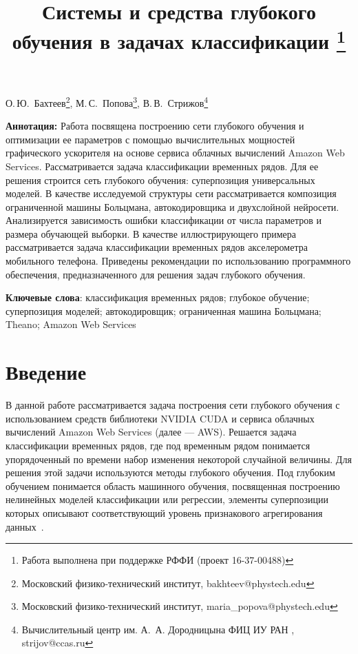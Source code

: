 \documentclass[12pt]{article}
\begin{document}
\title{Системы и средства глубокого обучения в задачах классификации%
\thanks{Работа выполнена при поддержке РФФИ (проект 16-37-00488)}}
\date{}
\maketitle

 \begin{center}
 {О.\,Ю.~Бахтеев\footnote{Московский физико-технический институт, bakhteev@phystech.edu},
 М.\,С.~Попова\footnote{Московский физико-технический институт, maria\_popova@phystech.edu},
 В.\,В.~Стрижов\footnote{Вычислительный центр им. А.~А. Дородницына
 ФИЦ ИУ РАН%
, strijov@ccas.ru}} %
 \end{center}

\textbf{Аннотация:} Работа посвящена построению сети глубокого обучения и оптимизации ее параметров с помощью вычислительных мощностей графического ускорителя на основе сервиса облачных вычислений Amazon Web Services. Рассматривается задача классификации временных рядов. Для ее решения строится сеть глубокого обучения: суперпозиция универсальных моделей. В качестве исследуемой структуры сети рассматривается композиция ограниченной машины Больцмана, автокодировщика и двухслойной нейросети. Анализируется зависимость ошибки классификации от числа параметров и размера обучающей выборки. В качестве иллюстрирующего примера рассматривается задача классификации временных рядов акселерометра мобильного телефона. Приведены рекомендации по использованию программного обеспечения, предназначенного для решения задач глубокого обучения.

\bigskip
\textbf{Ключевые слова}:  классификация временных рядов; глубокое обучение; суперпозиция моделей; автокодировщик; ограниченная машина Больцмана; Theano; Amazon Web Services

\section{Введение}
В данной работе рассматривается задача построения сети глубокого обучения с использованием средств библиотеки NVIDIA CUDA и сервиса облачных вычислений Amazon Web Services (далее --- AWS). Решается задача классификации временных рядов, где
под временным рядом понимается упорядоченный по времени набор изменения некоторой случайной величины. Для решения этой задачи используются методы глубокого обучения. Под глубоким обучением понимается область машинного обучения, посвященная построению нелинейных моделей классификации или регрессии, элементы суперпозиции которых описывают соответствующий уровень признакового агрегирования данных~\cite{foundamentals}.
\end{document}
